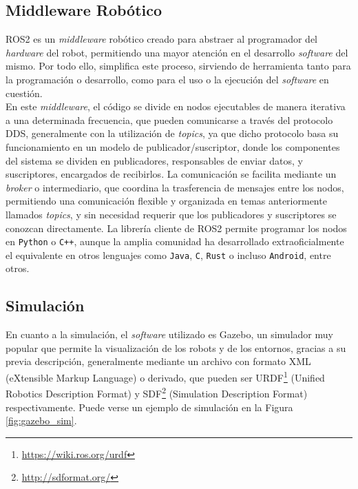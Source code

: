 \subsection{Middleware Robótico}
\label{sec:middleware_robotico}

ROS2 es un \textit{middleware} robótico creado para abstraer al programador del
\textit{hardware} del robot, permitiendo una mayor atención en el desarrollo
\textit{software} del mismo.
Por todo ello, simplifica este proceso, sirviendo de herramienta tanto para la
programación o desarrollo, como para el uso o la ejecución del \textit{software}
en cuestión.
\\

En este \textit{middleware}, el código se divide en nodos ejecutables de manera
iterativa a una determinada frecuencia, que pueden comunicarse a través del
protocolo DDS, generalmente con la utilización de \textit{topics}, ya que dicho
protocolo basa su funcionamiento en un modelo de publicador/suscriptor, donde
los componentes del sistema se dividen en publicadores, responsables de enviar
datos, y suscriptores, encargados de recibirlos.
La comunicación se facilita mediante un \textit{broker} o intermediario, que
coordina la trasferencia de mensajes entre los nodos, permitiendo una
comunicación flexible y organizada en temas anteriormente llamados
\textit{topics}, y sin necesidad requerir que los publicadores y suscriptores
se conozcan directamente.
La librería cliente de ROS2 permite programar los nodos en \texttt{Python} o
\texttt{C++}, aunque la amplia comunidad ha desarrollado extraoficialmente el
equivalente en otros lenguajes como \texttt{Java}, \texttt{C}, \texttt{Rust} o
incluso \texttt{Android}, entre otros.
\\


\subsection{Simulación}
\label{sec:simulacion}

En cuanto a la simulación, el \textit{software} utilizado es Gazebo, un
simulador muy popular que permite la visualización de los robots y de los
entornos, gracias a su previa descripción, generalmente mediante un archivo con
formato XML (eXtensible Markup Language) o derivado, que pueden ser
URDF\footnote{\url{https://wiki.ros.org/urdf}} (Unified Robotics Description
Format) y SDF\footnote{\url{http://sdformat.org/}} (Simulation Description
Format) respectivamente.
Puede verse un ejemplo de simulación en la Figura \ref{fig:gazebo_sim}.
\\

